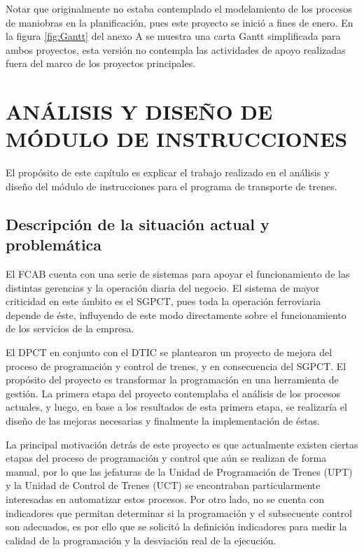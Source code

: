 \documentclass[oneside,12pt, letterpaper, titlepage]{book}
\begin{document}
Notar que originalmente no estaba contemplado el modelamiento de los procesos de maniobras en la planificación, pues este proyecto se inició a fines de enero. En la figura \ref{fig:Gantt} del anexo A se muestra una carta Gantt simplificada para ambos proyectos, esta versión no contempla las actividades de apoyo realizadas fuera del marco de los proyectos principales.



\chapter[Análisis y Diseño de Módulo de Instrucciones]{ANÁLISIS Y DISEÑO DE MÓDULO DE INSTRUCCIONES}
El propósito de este capítulo es explicar el trabajo realizado en el análisis y diseño del módulo de instrucciones para el programa de transporte de trenes.

\section{Descripción de la situación actual y problemática}
El FCAB cuenta con una serie de sistemas para apoyar el funcionamiento de las distintas gerencias y la operación diaria del negocio. El sistema de mayor criticidad en este ámbito es el SGPCT, pues toda la operación ferroviaria depende de éste, influyendo de este modo directamente sobre el funcionamiento de los servicios de la empresa.

El DPCT en conjunto con el DTIC se plantearon un proyecto de mejora del proceso de programación y control de trenes, y en consecuencia del SGPCT. El propósito del proyecto es transformar la programación en una herramienta de gestión. La primera etapa del proyecto contemplaba el análisis de los procesos actuales, y luego, en base a los resultados de esta primera etapa, se realizaría el diseño de las mejoras necesarias y finalmente la implementación de éstas. 

La principal motivación detrás de este proyecto es que actualmente existen ciertas etapas del proceso de programación y control que aún se realizan de forma manual, por lo que las jefaturas de la Unidad de Programación de Trenes (UPT) y la Unidad de Control de Trenes (UCT) se encontraban particularmente interesadas en automatizar estos procesos. Por otro lado, no se cuenta con indicadores que permitan determinar si la programación y el subsecuente control son adecuados, es por ello que se solicitó la definición indicadores para medir la calidad de la programación y la desviación real de la ejecución. 
\end{document}
